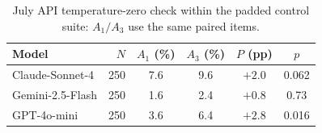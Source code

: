 \begin{table}[htbp]
\caption{July API temperature-zero check within the padded control suite: $A_1/A_3$ use the same paired items.}
\label{tab:api_t0}
\centering
\small
\setlength{\tabcolsep}{3.5pt}
\begin{tabular}{lrcccc}
\toprule
Model & $N$ & $A_1$ (\%) & $A_3$ (\%) & $P$ (pp) & $p$ \\
\midrule
Claude-Sonnet-4 & 250 & 7.6 & 9.6 & $+2.0$ & 0.062 \\
Gemini-2.5-Flash & 250 & 1.6 & 2.4 & $+0.8$ & 0.73 \\
GPT-4o-mini & 250 & 3.6 & 6.4 & $+2.8$ & 0.016 \\
\bottomrule
\end{tabular}
\end{table}
